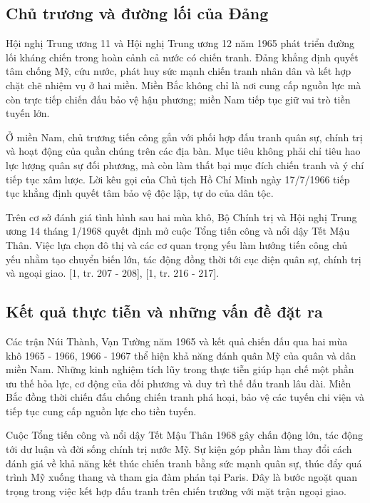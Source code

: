\subsection{Chủ trương và đường lối của Đảng}

Hội nghị Trung ương 11 và Hội nghị Trung ương 12 năm 1965 phát triển đường lối kháng chiến trong hoàn cảnh cả nước có chiến tranh. Đảng khẳng định quyết tâm chống Mỹ, cứu nước, phát huy sức mạnh chiến tranh nhân dân và kết hợp chặt chẽ nhiệm vụ ở hai miền. Miền Bắc không chỉ là nơi cung cấp nguồn lực mà còn trực tiếp chiến đấu bảo vệ hậu phương; miền Nam tiếp tục giữ vai trò tiền tuyến lớn.

Ở miền Nam, chủ trương tiến công gắn với phối hợp đấu tranh quân sự, chính trị và hoạt động của quần chúng trên các địa bàn. Mục tiêu không phải chỉ tiêu hao lực lượng quân sự đối phương, mà còn làm thất bại mục đích chiến tranh và ý chí tiếp tục xâm lược. Lời kêu gọi của Chủ tịch Hồ Chí Minh ngày 17/7/1966 tiếp tục khẳng định quyết tâm bảo vệ độc lập, tự do của dân tộc.

Trên cơ sở đánh giá tình hình sau hai mùa khô, Bộ Chính trị và Hội nghị Trung ương 14 tháng 1/1968 quyết định mở cuộc Tổng tiến công và nổi dậy Tết Mậu Thân. Việc lựa chọn đô thị và các cơ quan trọng yếu làm hướng tiến công chủ yếu nhằm tạo chuyển biến lớn, tác động đồng thời tới cục diện quân sự, chính trị và ngoại giao. [1, tr. 207 - 208], [1, tr. 216 - 217].

\subsection{Kết quả thực tiễn và những vấn đề đặt ra}

Các trận Núi Thành, Vạn Tường năm 1965 và kết quả chiến đấu qua hai mùa khô 1965 - 1966, 1966 - 1967 thể hiện khả năng đánh quân Mỹ của quân và dân miền Nam. Những kinh nghiệm tích lũy trong thực tiễn giúp hạn chế một phần ưu thế hỏa lực, cơ động của đối phương và duy trì thế đấu tranh lâu dài. Miền Bắc đồng thời chiến đấu chống chiến tranh phá hoại, bảo vệ các tuyến chi viện và tiếp tục cung cấp nguồn lực cho tiền tuyến.

Cuộc Tổng tiến công và nổi dậy Tết Mậu Thân 1968 gây chấn động lớn, tác động tới dư luận và đời sống chính trị nước Mỹ. Sự kiện góp phần làm thay đổi cách đánh giá về khả năng kết thúc chiến tranh bằng sức mạnh quân sự, thúc đẩy quá trình Mỹ xuống thang và tham gia đàm phán tại Paris. Đây là bước ngoặt quan trọng trong việc kết hợp đấu tranh trên chiến trường với mặt trận ngoại giao.

